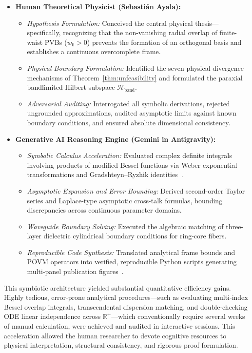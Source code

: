 \documentclass[11pt,a4paper]{article}
\begin{document}
\begin{itemize}
    \item \textbf{Human Theoretical Physicist (Sebastián Ayala):}
    \begin{itemize}
        \item \emph{Hypothesis Formulation:} Conceived the central physical thesis---specifically, recognizing that the non-vanishing radial overlap of finite-waist PVBs ($w_0 > 0$) prevents the formation of an orthogonal basis and establishes a continuous overcomplete frame.
        \item \emph{Physical Boundary Formulation:} Identified the seven physical divergence mechanisms of Theorem~\ref{thm:unfeasibility} and formulated the paraxial bandlimited Hilbert subspace $\mathcal{H}_{\text{band}}$.
        \item \emph{Adversarial Auditing:} Interrogated all symbolic derivations, rejected ungrounded approximations, audited asymptotic limits against known boundary conditions, and ensured absolute dimensional consistency.
    \end{itemize}
    \item \textbf{Generative AI Reasoning Engine (Gemini in Antigravity):}
    \begin{itemize}
        \item \emph{Symbolic Calculus Acceleration:} Evaluated complex definite integrals involving products of modified Bessel functions via Weber exponential transformations and Gradshteyn--Ryzhik identities~\cite{Gradshteyn2014}.
        \item \emph{Asymptotic Expansion and Error Bounding:} Derived second-order Taylor series and Laplace-type asymptotic cross-talk formulas, bounding discrepancies across continuous parameter domains.
        \item \emph{Waveguide Boundary Solving:} Executed the algebraic matching of three-layer dielectric cylindrical boundary conditions for ring-core fibers.
        \item \emph{Reproducible Code Synthesis:} Translated analytical frame bounds and POVM operators into verified, reproducible Python scripts generating multi-panel publication figures~\cite{Zhu2026PaperBanana}.
    \end{itemize}
\end{itemize}

This symbiotic architecture yielded substantial quantitative efficiency gains. Highly tedious, error-prone analytical procedures---such as evaluating multi-index Bessel overlap integrals, transcendental dispersion matching, and double-checking ODE linear independence across $\mathbb{R}^+$---which conventionally require several weeks of manual calculation, were achieved and audited in interactive sessions. This acceleration allowed the human researcher to devote cognitive resources to physical interpretation, structural consistency, and rigorous proof formulation.
\end{document}
